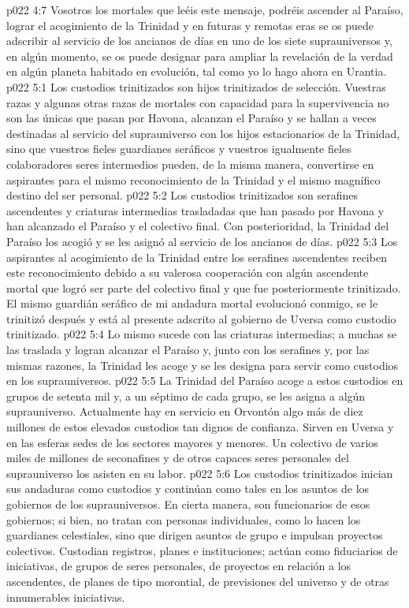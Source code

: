 \vs p022 4:7 Vosotros los mortales que leéis este mensaje, podréis ascender al Paraíso, lograr el acogimiento de la Trinidad y en futuras y remotas eras se os puede adscribir al servicio de los ancianos de días en uno de los siete suprauniversos y, en algún momento, se os puede designar para ampliar la revelación de la verdad en algún planeta habitado en evolución, tal como yo lo hago ahora en Urantia.
\vs p022 5:1 Los custodios trinitizados son hijos trinitizados de selección. Vuestras razas y algunas otras razas de mortales con capacidad para la supervivencia no son las únicas que pasan por Havona, alcanzan el Paraíso y se hallan a veces destinadas al servicio del suprauniverso con los hijos estacionarios de la Trinidad, sino que vuestros fieles guardianes seráficos y vuestros igualmente fieles colaboradores seres intermedios pueden, de la misma manera, convertirse en aspirantes para el mismo reconocimiento de la Trinidad y el mismo magnífico destino del ser personal.
\vs p022 5:2 Los custodios trinitizados son serafines ascendentes y criaturas intermedias trasladadas que han pasado por Havona y han alcanzado el Paraíso y el colectivo final. Con posterioridad, la Trinidad del Paraíso los acogió y se les asignó al servicio de los ancianos de días.
\vs p022 5:3 Los aspirantes al acogimiento de la Trinidad entre los serafines ascendentes reciben este reconocimiento debido a su valerosa cooperación con algún ascendente mortal que logró ser parte del colectivo final y que fue posteriormente trinitizado. El mismo guardián seráfico de mi andadura mortal evolucionó conmigo, se le trinitizó después y está al presente adscrito al gobierno de Uversa como custodio trinitizado.
\vs p022 5:4 Lo mismo sucede con las criaturas intermedias; a muchas se las traslada y logran alcanzar el Paraíso y, junto con los serafines y, por las mismas razones, la Trinidad les acoge y se les designa para servir como custodios en los suprauniversos.
\vs p022 5:5 La Trinidad del Paraíso acoge a estos custodios en grupos de setenta mil y, a un séptimo de cada grupo, se les asigna a algún suprauniverso. Actualmente hay en servicio en Orvontón algo más de diez millones de estos elevados custodios tan dignos de confianza. Sirven en Uversa y en las esferas sedes de los sectores mayores y menores. Un colectivo de varios miles de millones de seconafines y de otros capaces seres personales del suprauniverso los asisten en su labor.
\vs p022 5:6 Los custodios trinitizados inician sus andaduras como custodios y continúan como tales en los asuntos de los gobiernos de los suprauniversos. En cierta manera, son funcionarios de esos gobiernos; si bien, no tratan con personas individuales, como lo hacen los guardianes celestiales, sino que dirigen asuntos de grupo e impulsan proyectos colectivos. Custodian registros, planes e instituciones; actúan como fiduciarios de iniciativas, de grupos de seres personales, de proyectos en relación a los ascendentes, de planes de tipo morontial, de previsiones del universo y de otras innumerables iniciativas.
